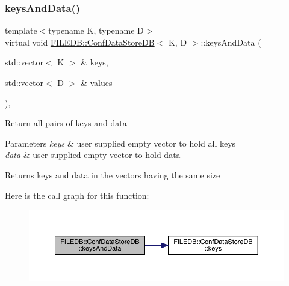 \subsubsection{\texorpdfstring{keysAndData()}{keysAndData()}\hspace{0.1cm}{\footnotesize\ttfamily [3/3]}}
{\footnotesize\ttfamily template$<$typename K, typename D$>$ \\
virtual void \mbox{\hyperlink{classFILEDB_1_1ConfDataStoreDB}{F\+I\+L\+E\+D\+B\+::\+Conf\+Data\+Store\+DB}}$<$ K, D $>$\+::keys\+And\+Data (\begin{DoxyParamCaption}\item[{std\+::vector$<$ K $>$ \&}]{keys,  }\item[{std\+::vector$<$ D $>$ \&}]{values }\end{DoxyParamCaption})\hspace{0.3cm}{\ttfamily [inline]}, {\ttfamily [virtual]}}

Return all pairs of keys and data 
\begin{DoxyParams}{Parameters}
{\em keys} & user supplied empty vector to hold all keys \\
\hline
{\em data} & user supplied empty vector to hold data \\
\hline
\end{DoxyParams}
\begin{DoxyReturn}{Returns}
keys and data in the vectors having the same size 
\end{DoxyReturn}
Here is the call graph for this function\+:
\nopagebreak
\begin{figure}[H]
\begin{center}
\leavevmode
\includegraphics[width=350pt]{d8/d19/classFILEDB_1_1ConfDataStoreDB_a94333e6aab463fd336bffb28d81dd39d_cgraph}
\end{center}
\end{figure}
\mbox{\label{classFILEDB_1_1ConfDataStoreDB_ab87e2fb12067bfb19c1f381a433fd442}} 
